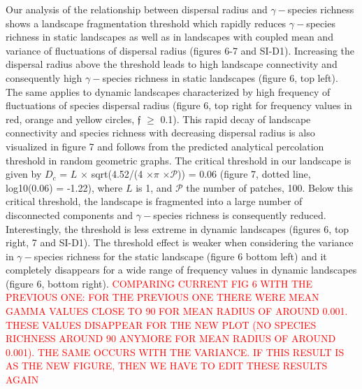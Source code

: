 \documentclass[12pt]{article}
\newcommand{\carlos}[1]{\textcolor{Red}{#1}}
\begin{document}
Our analysis of the relationship between dispersal radius and $\gamma-$species richness shows a landscape fragmentation threshold which rapidly reduces $\gamma-$species richness in static landscapes as well as in landscapes with coupled mean and variance of fluctuations of dispersal radius (figures 6-7 and SI-D1). Increasing the dispersal radius above the threshold leads to high landscape connectivity and consequently high $\gamma-$species richness in static landscapes (figure 6, top left). The same applies to dynamic landscapes characterized by high frequency of fluctuations of species dispersal radius (figure 6, top right for frequency values in red, orange and yellow circles, $\mathfrak{f}$ $\geq$ 0.1). This rapid decay of landscape connectivity and species richness with decreasing dispersal radius is also visualized in figure 7 and follows from the predicted analytical percolation threshold in random geometric graphs. The critical threshold in our landscape is given by $D_c$ = $L$ $\times$ sqrt(4.52/(4 $\times$$\pi$ $\times$$\mathcal{P}$)) = 0.06 (figure 7, dotted line, log10(0.06) = -1.22), where $L$ is 1, and $\mathcal{P}$ the number of patches, 100. Below this critical threshold, the landscape is fragmented into a large number of disconnected components and $\gamma-$species richness is consequently reduced. Interestingly, the threshold is less extreme in dynamic landscapes (figures 6, top right, 7 and SI-D1). The threshold effect is weaker when considering the variance in $\gamma-$species richness for the static landscape (figure 6 bottom left) and it completely disappears for a wide range of frequency values in dynamic landscapes (figure 6, bottom right). \carlos{COMPARING CURRENT FIG 6 WITH THE PREVIOUS ONE: FOR THE PREVIOUS ONE THERE WERE MEAN GAMMA VALUES CLOSE TO 90 FOR MEAN RADIUS OF AROUND 0.001. THESE VALUES DISAPPEAR FOR THE NEW PLOT (NO SPECIES RICHNESS AROUND 90 ANYMORE FOR MEAN RADIUS OF AROUND 0.001). THE SAME OCCURS WITH THE VARIANCE. IF THIS RESULT IS AS THE NEW FIGURE, THEN WE HAVE TO EDIT THESE RESULTS AGAIN}
\end{document}
